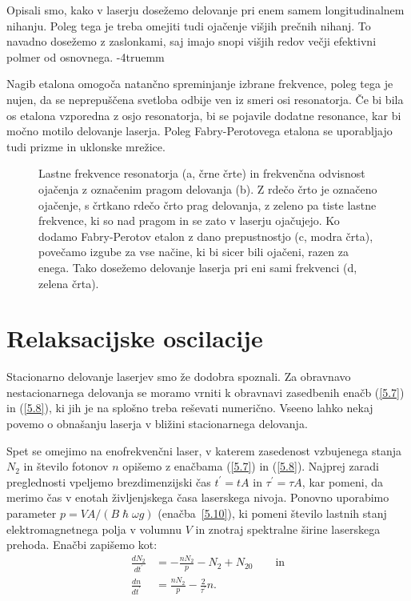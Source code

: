 Opisali smo, kako v laserju dosežemo delovanje pri enem samem longitudinalnem nihanju.
Poleg tega je treba omejiti tudi ojačenje višjih prečnih nihanj. To navadno 
dosežemo z zaslonkami, saj imajo snopi višjih redov večji efektivni polmer od osnovnega. 
\vglue-4truemm
\begin{remark}
Nagib etalona omogoča natančno spreminjanje izbrane frekvence, poleg tega
 je nujen, da se neprepuščena svetloba odbije ven iz smeri osi resonatorja. Če bi 
bila os etalona vzporedna z osjo resonatorja, bi se pojavile dodatne resonance, 
kar bi močno motilo delovanje laserja. Poleg Fabry-Perotovega etalona se uporabljajo
tudi prizme in uklonske mrežice.
\end{remark}
\begin{figure}[ht]
\centering
\def\svgwidth{94truemm} 

\caption{Lastne frekvence resonatorja (a, črne črte) in frekvenčna odvisnost 
ojačenja z označenim pragom delovanja (b). Z rdečo črto je označeno ojačenje, s črtkano
rdečo črto prag delovanja, z zeleno pa tiste 
lastne frekvence, ki so nad pragom in se zato v laserju ojačujejo. 
Ko dodamo Fabry-Perotov etalon z dano prepustnostjo (c, modra črta), povečamo
izgube za vse načine, ki bi sicer bili ojačeni, razen za enega. 
Tako dosežemo delovanje laserja pri eni sami frekvenci (d, zelena črta).}
\label{fig:FPmodes}
\end{figure}

\section{Relaksacijske oscilacije}
Stacionarno delovanje laserjev smo že dodobra spoznali. Za obravnavo
nestacionarnega delovanja  se moramo vrniti k obravnavi zasedbenih enačb 
(\ref{5.7}) in (\ref{5.8}), ki jih je na splošno treba reševati numerično. 
Vseeno lahko nekaj povemo o obnašanju laserja
v bližini stacionarnega delovanja. 

Spet se omejimo na enofrekvenčni laser, v katerem zasedenost vzbujenega stanja $N_2$
in število fotonov $n$ opišemo z enačbama (\ref{5.7})
in (\ref{5.8}). Najprej zaradi preglednosti vpeljemo
brezdimenzijski čas $t^{\prime}=t A$ in $\tau^{\prime}=\tau A$, kar pomeni, da merimo 
čas v enotah življenjskega časa laserskega nivoja. Ponovno uporabimo parameter
$p=VA/(B\hslash\omega g)$ (enačba~\ref{5.10}), ki pomeni število lastnih stanj 
elektromagnetnega polja v volumnu $V$ in znotraj spektralne širine laserskega prehoda. 
Enačbi zapišemo kot:
\begin{align}  
\frac{d N_2}{d t^{\prime}}&=-\frac{nN_2}{p}-N_2+N_{20} \label{5.23a} \qquad \mathrm{in}\\
\frac{d n}{d t^{\prime}}& =  \frac{nN_2}{p}-\frac{2}{\tau^{\prime}}n.
\label{5.23}
\end{align}

